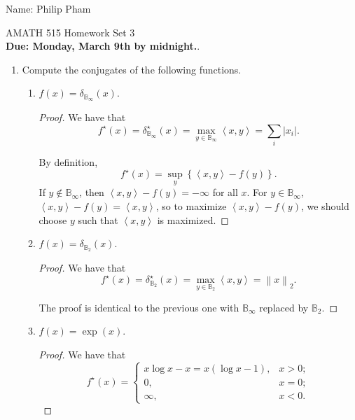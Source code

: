 \documentclass[11pt]{amsart}
\begin{document}
{\Large Name: Philip Pham}  \\
\begin{center}
\Large AMATH 515 \hskip 2in Homework Set 3\\
{\bf Due: Monday, March 9th by midnight.}. 
\end{center}
\bigskip
\begin{enumerate}

\item  Compute the conjugates of the following functions.  
\begin{enumerate}
\item $f(x) = \delta_{\mathbb{B}_{\infty}}(x)$.
  \begin{proof}
    We have that
    \begin{equation*}
      \boxed{
        f^\star(x) =
        \delta^\star_{\mathbb{B}_{\infty}}(x)
        = \max_{y \in \mathbb{B}_{\infty}} \left\langle x, y \right\rangle
        = \sum_i \left|x_i\right|.}
    \end{equation*}

    By definition,
    \begin{equation*}
      f^\star(x) = \sup_{y}\left\{\left\langle x, y \right\rangle - f(y)\right\}.           
    \end{equation*}
    If $y \not\in \mathbb{B}_{\infty}$, then
    $\left\langle x, y \right\rangle - f(y) = -\infty$ for all $x$. For
    $y \in \mathbb{B}_{\infty}$,
    $\left\langle x, y \right\rangle - f(y) = \left\langle x, y \right\rangle$,
    so to maximize $\left\langle x, y \right\rangle - f(y)$, we should choose
    $y$ such that $\left\langle x, y \right\rangle$ is maximized.
  \end{proof}
\item $f(x) = \delta_{\mathbb{B}_{2}}(x)$.
  \begin{proof}
    We have that
    \begin{equation*}
      \boxed{
        f^\star(x) =
        \delta^\star_{\mathbb{B}_{2}}(x)
        = \max_{y \in \mathbb{B}_{2}} \left\langle x, y \right\rangle
        = \left\|x\right\|_2.}      
    \end{equation*}
    
    The proof is identical to the previous one with $\mathbb{B}_{\infty}$
    replaced by $\mathbb{B}_2$.
  \end{proof}
\item $f(x) = \exp(x)$.
  \begin{proof}
    We have that
    \begin{equation*}
      \boxed{f^\star(x) =
        \begin{cases}
          x\log x - x = x\left(\log x - 1\right), &x > 0; \\
          0, &x = 0; \\
          \infty, &x < 0.
        \end{cases}}
    \end{equation*}


\end{proof}
\end{enumerate}
\end{enumerate}
\end{document}
